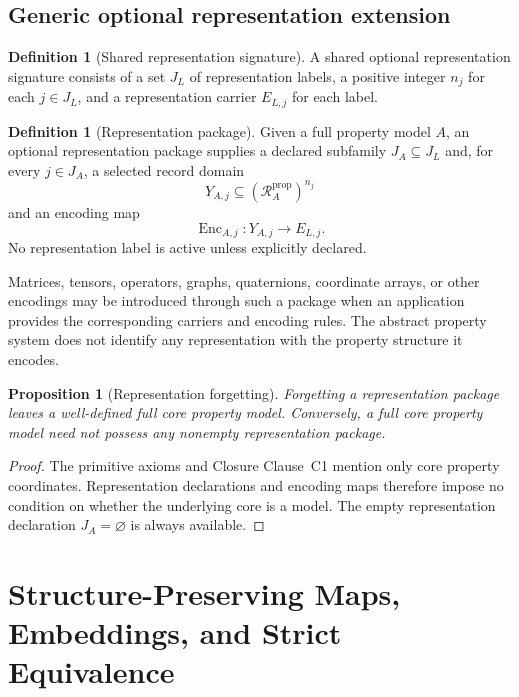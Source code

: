\documentclass[11pt]{article}
\newcommand{\PropRec}{\mathcal R^{\mathrm{prop}}}
\newcommand{\Enc}{\operatorname{Enc}}
\newtheorem{proposition}[theorem]{Proposition}
\theoremstyle{definition}
\newtheorem{definition}[theorem]{Definition}
\theoremstyle{remark}
\begin{document}
\subsection{Generic optional representation extension}

\begin{definition}[Shared representation signature]
A shared optional representation signature consists of a set \(J_L\) of representation labels, a positive integer \(n_j\) for each \(j\in J_L\), and a representation carrier \(E_{L,j}\) for each label.
\end{definition}

\begin{definition}[Representation package]
Given a full property model \(A\), an optional representation package supplies a declared subfamily \(J_A\subseteq J_L\) and, for every \(j\in J_A\), a selected record domain
\[
Y_{A,j}\subseteq(\PropRec_A)^{n_j}
\]
and an encoding map
\[
\Enc_{A,j}:Y_{A,j}\longrightarrow E_{L,j}.
\]
No representation label is active unless explicitly declared.
\end{definition}

Matrices, tensors, operators, graphs, quaternions, coordinate arrays, or other encodings may be introduced through such a package when an application provides the corresponding carriers and encoding rules.
The abstract property system does not identify any representation with the property structure it encodes.

\begin{proposition}[Representation forgetting]
Forgetting a representation package leaves a well-defined full core property model.
Conversely, a full core property model need not possess any nonempty representation package.
\end{proposition}

\begin{proof}
The primitive axioms and Closure Clause~C1 mention only core property coordinates.
Representation declarations and encoding maps therefore impose no condition on whether the underlying core is a model.
The empty representation declaration \(J_A=\varnothing\) is always available.
\end{proof}

\section{Structure-Preserving Maps, Embeddings, and Strict Equivalence}
\label{sec:maps}
\end{document}
